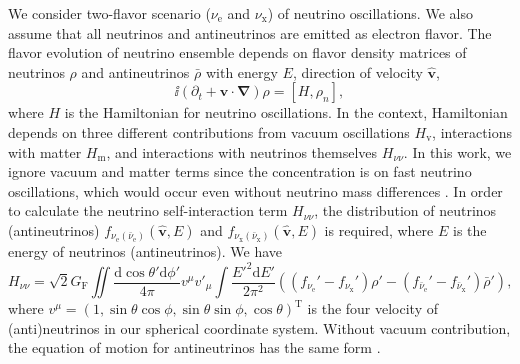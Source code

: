 We consider two-flavor scenario ($\nu_{\mathrm e}$ and $\nu_{\mathrm x}$) of neutrino oscillations. We also assume that all neutrinos and antineutrinos are emitted as electron flavor. The flavor evolution of neutrino ensemble depends on flavor density matrices of neutrinos $\rho$ and antineutrinos $\bar\rho$ with energy $E$, direction of velocity $\hat{\mathbf v}$,
\begin{equation}
\ii (\partial_t + \mathbf v\cdot \mathbf{\nabla}) \rho = \left[H, \rho_n \right],
\label{eqn-liouville-eqn}
\end{equation}
where $H$ is the Hamiltonian for neutrino oscillations. In the context, Hamiltonian depends on three different contributions from vacuum oscillations $H_{\mathrm v}$, interactions with matter $H_{\mathrm m}$, and interactions with neutrinos themselves $H_{\nu\nu}$. In this work, we ignore vacuum and matter terms since the concentration is on fast neutrino oscillations, which would occur even without neutrino mass differences \cite{Chakraborty2016,Dasgupta2017}. In order to calculate the neutrino self-interaction term $H_{\nu\nu}$, the distribution of neutrinos (antineutrinos) $f_{\nu_{\mathrm e}(\bar \nu_{\mathrm e})}(\hat{\mathbf v}, E)$ and $f_{\nu_{\mathrm x}(\bar \nu_{\mathrm x})}(\hat{\mathbf v}, E)$ is required, where $E$ is the energy of neutrinos (antineutrinos). We have
\begin{equation}
H_{\nu\nu} = \sqrt{2} G_{\mathrm F} \iint \frac{\mathrm d \cos\theta' \mathrm d\phi'}{4\pi} v^\mu v'_\mu \int \frac{E'^2 \mathrm d E'}{2\pi^2} \left( (f_{\nu_{\mathrm e}}' - f_{\nu_{\mathrm x}}' )\rho' -  (f_{\bar\nu_{\mathrm e}}' - f_{\bar\nu_{\mathrm x}}' ) \bar\rho' \right),
\end{equation}
where $v^\mu = ( 1, \sin\theta\cos\phi, \sin\theta\sin\phi, \cos\theta )^{\mathrm T}$ is the four velocity of (anti)neutrinos in our spherical coordinate system. Without vacuum contribution, the equation of motion for antineutrinos has the same form \cite{Duan2010}.

